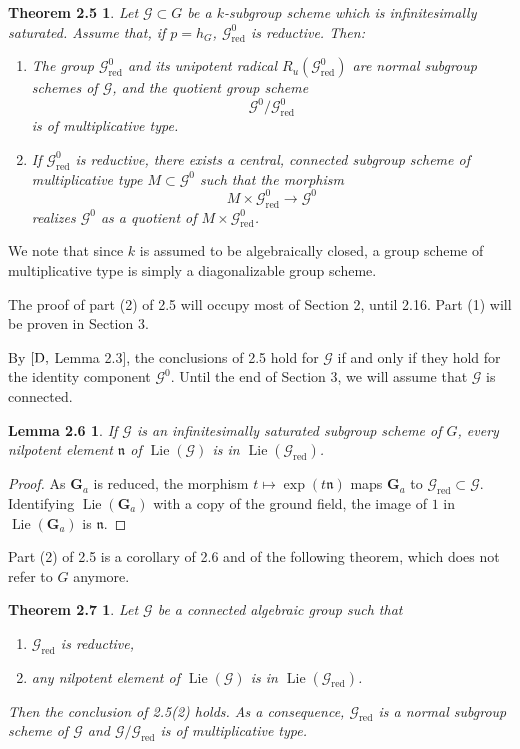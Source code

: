 \documentclass[11pt]{article}
\newtheorem*{theorem25}{Theorem 2.5}
\newtheorem*{lemma26}{Lemma 2.6}
\newcommand{\Ga}{\mathbf G_a}
\newcommand{\Lie}{\operatorname{Lie}}
\newcommand{\Ru}{R_u}
\newcommand{\red}{\mathrm{red}}
\newtheorem*{theorem27}{Theorem 2.7}
\begin{document}
\begin{theorem25}
Let \(\mathcal G\subset G\) be a \(k\)-subgroup scheme which is infinitesimally
saturated. Assume that, if \(p=h_G\), \(\mathcal G^0_{\red}\) is reductive. Then:
\begin{enumerate}[label=(\arabic*),leftmargin=2em]
\item The group \(\mathcal G^0_{\red}\) and its unipotent radical
\(\Ru(\mathcal G^0_{\red})\) are normal subgroup schemes of \(\mathcal G\), and the
quotient group scheme
\[
  \mathcal G^0/\mathcal G^0_{\red}
\]
is of multiplicative type.
\item If \(\mathcal G^0_{\red}\) is reductive, there exists a central, connected subgroup
scheme of multiplicative type \(M\subset \mathcal G^0\) such that the morphism
\[
  M\times \mathcal G^0_{\red}\longrightarrow \mathcal G^0
\]
realizes \(\mathcal G^0\) as a quotient of \(M\times \mathcal G^0_{\red}\).
\end{enumerate}
\end{theorem25}

We note that since \(k\) is assumed to be algebraically closed, a group scheme of
multiplicative type is simply a diagonalizable group scheme.

The proof of part (2) of 2.5 will occupy most of Section 2, until 2.16. Part (1) will
be proven in Section 3.

By \([{\rm D},\) Lemma 2.3], the conclusions of 2.5 hold for \(\mathcal G\) if and
only if they hold for the identity component \(\mathcal G^0\). Until the end of
Section 3, we will assume that \(\mathcal G\) is connected.

\begin{lemma26}
If \(\mathcal G\) is an infinitesimally saturated subgroup scheme of \(G\), every
nilpotent element \(\mathfrak n\) of \(\Lie(\mathcal G)\) is in
\(\Lie(\mathcal G_{\red})\).
\end{lemma26}

\begin{proof}
As \(\Ga\) is reduced, the morphism \(t\mapsto \exp(t\mathfrak n)\) maps \(\Ga\) to
\(\mathcal G_{\red}\subset \mathcal G\). Identifying \(\Lie(\Ga)\) with a copy of the
ground field, the image of \(1\) in \(\Lie(\Ga)\) is \(\mathfrak n\).
\end{proof}



Part (2) of 2.5 is a corollary of 2.6 and of the following theorem, which does not refer to
\(G\) anymore.

\begin{theorem27}
Let \(\mathcal G\) be a connected algebraic group such that
\begin{enumerate}[label=(\alph*),leftmargin=2em]
\item \(\mathcal G_{\red}\) is reductive,
\item any nilpotent element of \(\Lie(\mathcal G)\) is in
\(\Lie(\mathcal G_{\red})\).
\end{enumerate}
Then the conclusion of 2.5(2) holds. As a consequence,
\(\mathcal G_{\red}\) is a normal subgroup scheme of \(\mathcal G\) and
\(\mathcal G/\mathcal G_{\red}\) is of multiplicative type.
\end{theorem27}
\end{document}
